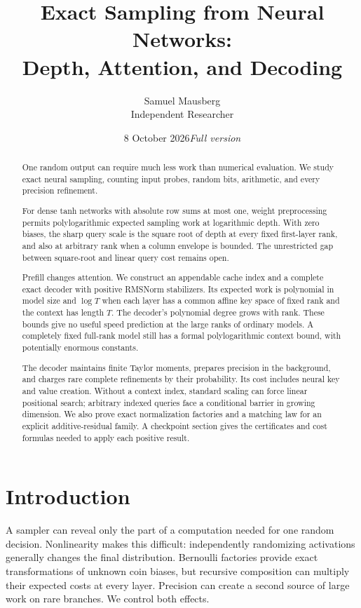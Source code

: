 \documentclass[11pt]{article}
\title{Exact Sampling from Neural Networks:\\Depth, Attention, and Decoding}
\author{Samuel Mausberg\\{\normalsize Independent Researcher}}
\date{8 October 2026\quad\textit{Full version}}
\theoremstyle{definition}
\theoremstyle{remark}
\numberwithin{equation}{section}
\begin{document}
\maketitle

\begin{abstract}
One random output can require much less work than numerical evaluation.
We study exact neural sampling, counting input probes, random bits,
arithmetic, and every precision refinement.

For dense tanh networks with absolute row sums at most one, weight
preprocessing permits polylogarithmic expected sampling work at
logarithmic depth. With zero biases, the sharp query scale is the square
root of depth at every fixed first-layer rank, and also at arbitrary
rank when a column envelope is bounded. The unrestricted gap between
square-root and linear query cost remains open.

Prefill changes attention. We construct an appendable cache index and a
complete exact decoder with positive RMSNorm stabilizers. Its expected
work is polynomial in model size and $\log T$ when each layer has a
common affine key space of fixed rank and the context has length $T$.
The decoder's polynomial degree grows with rank.
These bounds give no useful speed prediction at the large ranks of
ordinary models. A completely fixed full-rank model still has a formal
polylogarithmic context bound, with potentially enormous constants.

The decoder maintains finite Taylor moments, prepares precision in the
background, and charges rare complete refinements by their probability.
Its cost includes neural key and value creation. Without a context index,
standard scaling can force linear positional search; arbitrary indexed
queries face a conditional barrier in growing dimension. We also prove
exact normalization factories and a matching law for an explicit
additive-residual family. A checkpoint section gives the certificates
and cost formulas needed to apply each positive result.
\end{abstract}


\clearpage

\section{Introduction}
\label{sec:introduction}

A sampler can reveal only the part of a computation needed for one
random decision. Nonlinearity makes this difficult: independently
randomizing activations generally changes the final distribution.
Bernoulli factories provide exact transformations of unknown coin
biases, but recursive composition can multiply their expected costs
at every layer. Precision can create a second source of large work
on rare branches. We control both effects.
\end{document}
